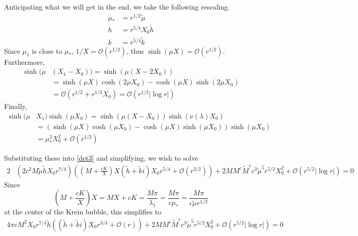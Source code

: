 \documentclass[10pt,reqno]{amsart}
\theoremstyle{plain}
\theoremstyle{definition}
\theoremstyle{remark}
\numberwithin{theorem}{section}
\numberwithin{equation}{section}
\begin{document}
Anticipating what we will get in the end, we take the following rescaling.
\begin{align*}
\mu_* &= r^{1/2} \tilde{\mu} \\
h &= r^{5/4} X_0 \tilde{h}  \\
k &= r^{5/4} \tilde{k} 
\end{align*}
Since $\mu_1$ is close to $\mu_*$, $1/X = \mathcal{O}(r^{1/2})$, thus $\sinh(\mu X) =  \mathcal{O}(r^{1/2})$. Furthermore, 
\begin{align*}
\sinh(\mu&(X_1 - X_0)) = \sinh(\mu(X - 2 X_0)) \\
&= \sinh(\mu X) \cosh(2 \mu X_0)  - \cosh(\mu X)\sinh(2 \mu X_0) \\
&= \mathcal{O}\left( r^{1/2} + r^{1/2} X_0 \right) 
= \mathcal{O}\left( r^{1/2}|\log r| \right) 
\end{align*}
Finally, 
\begin{align*}
\sinh(\mu &X_1)\sinh(\mu X_0) = \sinh(\mu ( X - X_0 )) \sinh(\nu(\lambda)X_0) \\
&= \left( \sinh(\mu X) \cosh( \mu X_0)  - \cosh(\mu X)\sinh(\mu X_0) \right)\sinh(\mu X_0) \\
&= \mu_*^2 X_0^2 + \mathcal{O}(r^{1/2})
\end{align*}

Substituting these into \cref{det3} and simplifying, we wish to solve
\begin{equation}\label{det4}
\begin{aligned}
2 &\left( 2 c^2 M \tilde{\mu} \tilde{h} X_0 r^{7/4} \right) 
\left( \left( M + \frac{c K}{X} \right) X ( \tilde{h} + \tilde{k} i) X_0 r^{5/4} + \mathcal{O}(r^{3/2}) \right) 
+ 2 M M^c \tilde{M}^c c^3 \tilde{\mu}^5 r^{5/2} X_0^2 + \mathcal{O}( r^{5/2} |\log r| ) = 0
\end{aligned}
\end{equation}
Since
\[
\left( M + \frac{c K}{X} \right) X  = MX + c K = \frac{M \pi}{\lambda_1} = \frac{M \pi}{c \mu_*}
= \frac{M \pi}{c \tilde{\mu}r^{1/2}}
\]
at the center of the Krein bubble, this simplifies to
\begin{equation}\label{det4}
\begin{aligned}
4 \pi c M^2 X_0 r^{7/4} \tilde{h} \left( ( \tilde{h} + \tilde{k} i) X_0 r^{3/4} + \mathcal{O}(r) \right) 
+ 2 M M^c \tilde{M}^c c^3 \tilde{\mu}^5 r^{5/2} X_0^2 + \mathcal{O}( r^{5/2} |\log r| ) = 0
\end{aligned}
\end{equation}
\end{document}
